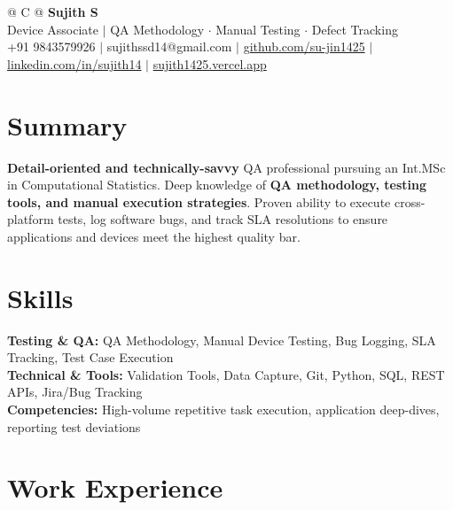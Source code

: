 \documentclass[a4paper,11pt]{article}
\newcommand{\ulink}[2]{\href{#1}{#2}}
\begin{document}
\pagestyle{empty}

\begin{tabularx}{\linewidth}{@{} C @{}}
{\color[HTML]{000000}\fontsize{30}{35}\selectfont\bfseries Sujith S} \\[5pt]
{\fontsize{10.5}{12.5}\selectfont\color[HTML]{3A3A3A}
Device Associate $|$ QA Methodology $\cdot$ Manual Testing $\cdot$ Defect Tracking} \\[6pt]
{\fontsize{9.5}{11.5}\selectfont\textcolor[HTML]{3A3A3A}{+91 9843579926 $|$ sujithssd14@gmail.com $|$ \ulink{https://github.com/su-jin1425}{github.com/su-jin1425} $|$ \ulink{https://linkedin.com/in/sujith14}{linkedin.com/in/sujith14} $|$ \ulink{https://sujith1425.vercel.app}{sujith1425.vercel.app}}}
\end{tabularx}

\section{Summary}
\vspace{2pt}

{\color[HTML]{0A0A0A}\fontsize{11}{14}\selectfont
\textbf{Detail-oriented and technically-savvy} QA professional pursuing an Int.MSc in Computational Statistics. Deep knowledge of \textbf{QA methodology, testing tools, and manual execution strategies}. Proven ability to execute cross-platform tests, log software bugs, and track SLA resolutions to ensure applications and devices meet the highest quality bar.}

\section{Skills}
\vspace{2pt}

{\color[HTML]{0A0A0A}\fontsize{11}{14}\selectfont
\textbf{Testing \& QA:} QA Methodology, Manual Device Testing, Bug Logging, SLA Tracking, Test Case Execution \\[2pt]
\textbf{Technical \& Tools:} Validation Tools, Data Capture, Git, Python, SQL, REST APIs, Jira/Bug Tracking \\[2pt]
\textbf{Competencies:} High-volume repetitive task execution, application deep-dives, reporting test deviations}

\section{Work Experience}
\vspace{2pt}
\end{document}
